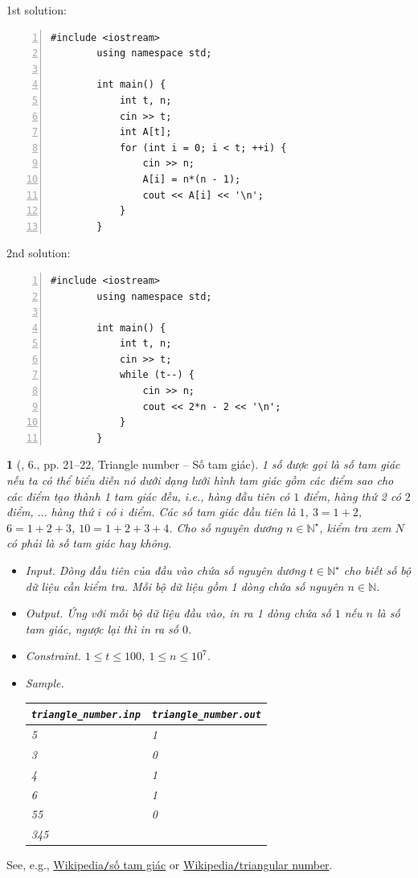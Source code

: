 \documentclass{article}
\newtheorem{baitoan}{}
\begin{document}
\begin{multicols}{2}
	1st solution:
	\begin{Verbatim}[numbers=left,xleftmargin=5mm]
		#include <iostream>
		using namespace std;
		
		int main() {
			int t, n;
			cin >> t;
			int A[t];
			for (int i = 0; i < t; ++i) {
				cin >> n;
				A[i] = n*(n - 1);
				cout << A[i] << '\n';
			}
		}	
	\end{Verbatim}
	\columnbreak
	2nd solution:
	\begin{Verbatim}[numbers=left,xleftmargin=5mm]
		#include <iostream>
		using namespace std;
		
		int main() {
			int t, n;
			cin >> t;
			while (t--) {
				cin >> n;
				cout << 2*n - 2 << '\n';
			}
		}
	\end{Verbatim}
\end{multicols}

\begin{baitoan}[\cite{Duc_200_BT_Python}, 6., pp. 21--22, Triangle number -- Số tam giác]
	1 số được gọi là \emph{số tam giác} nếu ta có thể biểu diễn nó dưới dạng lưới hình tam giác gồm các điểm sao cho các điểm tạo thành 1 tam giác đều, i.e., hàng đầu tiên có $1$ điểm, hàng thứ 2 có $2$ điểm, $\ldots$ hàng thứ $i$ có $i$ điểm. Các số tam giác đầu tiên là $1$, $3 = 1 + 2$, $6 = 1 + 2 + 3$, $10 = 1 + 2 + 3 + 4$. Cho số nguyên dương $n\in\mathbb{N}^\star$, kiểm tra xem $N$ có phải là số tam giác hay không. 
	\begin{itemize}
		\item {\sf Input.} Dòng đầu tiên của đầu vào chứa số nguyên dương $t\in\mathbb{N}^\star$ cho biết số bộ dữ liệu cần kiểm tra. Mỗi bộ dữ liệu gồm 1 dòng chứa số nguyên $n\in\mathbb{N}$.
		\item {\sf Output.} Ứng với mỗi bộ dữ liệu đầu vào, in ra 1 dòng chứa số $1$ nếu $n$ là số tam giác, ngược lại thì in ra số $0$.
		\item {\sf Constraint.} $1\le t\le100$, $1\le n\le10^7$.
		\item {\sf Sample.}
		\begin{table}[H]
			\centering
			\begin{tabular}{|l|l|}
				\hline
				\verb|triangle_number.inp| & \verb|triangle_number.out| \\
				\hline
				5 & 1 \\
				3 & 0 \\
				4 & 1 \\
				6 & 1 \\
				55 & 0 \\
				345 & \\
				\hline
			\end{tabular}
		\end{table}
	\end{itemize}
\end{baitoan}
See, e.g., \href{https://vi.wikipedia.org/wiki/S%E1%BB%91_tam_gi%C3%A1c}{Wikipedia{\tt/}số tam giác} or \href{https://en.wikipedia.org/wiki/Triangular_number}{Wikipedia{\tt/}triangular number}.
\end{document}
